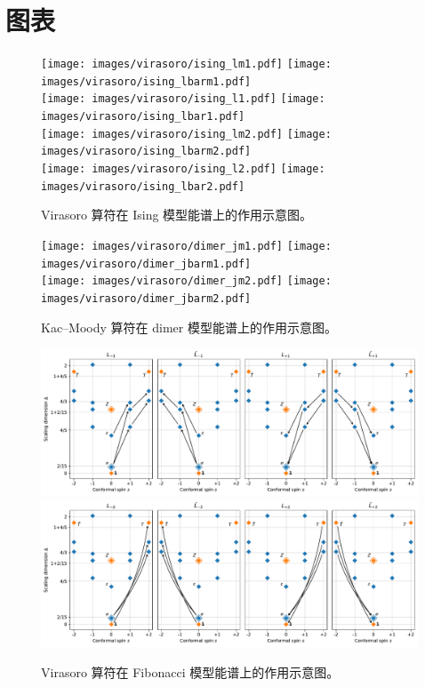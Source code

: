 \appendix

\chapter{图表}

\begin{figure}[ht]
  \vspace{-1.5cm}
  \centering
  \texttt{[image: images/virasoro/ising\_lm1.pdf]}    \quad
  \texttt{[image: images/virasoro/ising\_lbarm1.pdf]} \\
  \texttt{[image: images/virasoro/ising\_l1.pdf]}     \quad
  \texttt{[image: images/virasoro/ising\_lbar1.pdf]}  \\
  \texttt{[image: images/virasoro/ising\_lm2.pdf]}    \quad
  \texttt{[image: images/virasoro/ising\_lbarm2.pdf]} \\
  \texttt{[image: images/virasoro/ising\_l2.pdf]}     \quad
  \texttt{[image: images/virasoro/ising\_lbar2.pdf]}
  \caption[Virasoro 算符在 Ising 模型能谱上的作用示意图]{Virasoro 算符在 Ising 模型能谱上的作用示意图。}
  \label{fig:ising-virasoro-all}
\end{figure}

\begin{figure}[ht]
  \centering
  \texttt{[image: images/virasoro/dimer\_jm1.pdf]}    \quad
  \texttt{[image: images/virasoro/dimer\_jbarm1.pdf]} \\
  \texttt{[image: images/virasoro/dimer\_jm2.pdf]}    \quad
  \texttt{[image: images/virasoro/dimer\_jbarm2.pdf]}
  \caption[Kac--Moody 算符在 dimer 模型能谱上的作用示意图]{Kac--Moody 算符在 dimer 模型能谱上的作用示意图。}
  \label{fig:dimer-kac-moody-all}
\end{figure}

\begin{figure}[ht]
  \centering
  \includegraphics[width=\textwidth]{images/fibonacci/fib-virasoro-all-1.pdf} \\
  \includegraphics[width=\textwidth]{images/fibonacci/fib-virasoro-all-2.pdf}
  \caption[Virasoro 算符在 Fibonacci 模型能谱上的作用示意图]{Virasoro 算符在 Fibonacci 模型能谱上的作用示意图。}
  \label{fig:fib-virasoro-all}
\end{figure}

